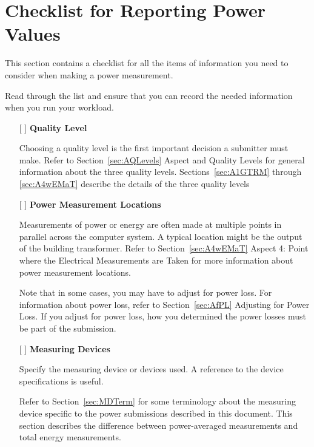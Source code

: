 \chapter{Checklist for Reporting Power Values}
\label{sec:checklist}


\noindent
This section contains a checklist for all the items of information you need 
to consider when making a power measurement. 
\wl

\noindent
Read through the list and ensure that you can record the needed 
information when you run your workload.
\wl

\begin{itemize}
\item[{[ ]}]
\textbf{Quality Level}

Choosing a quality level is the first important decision a submitter must make. Refer to 
Section~\ref{sec:AQLevels} Aspect and Quality Levels for general information about the three quality levels.  
Sections~\ref{sec:A1GTRM} through \ref{sec:A4wEMaT} describe the details of the three quality levels

\item[{[ ]}]
\textbf{Power Measurement Locations}

Measurements of power or energy are often made at multiple points in parallel across the computer system. A typical location might be the output of the building transformer.
Refer to Section~\ref{sec:A4wEMaT} Aspect 4: Point where the Electrical Measurements are Taken 
for more information about power measurement locations.

Note that in some cases, you may have to adjust for power loss. For information about power loss, refer to 
Section~\ref{sec:AfPL} Adjusting for Power Loss.  If you adjust for power loss, how you determined the power losses must be part of the submission.


\newpage

\item[{[ ]}]
\textbf{Measuring Devices}

Specify the measuring device or devices used. A reference to the device specifications is useful.

Refer to Section~\ref{sec:MDTerm} for some terminology about the measuring device specific to the power submissions described in this document. This section describes the difference between power-averaged measurements and total energy measurements.


\end{itemize}
